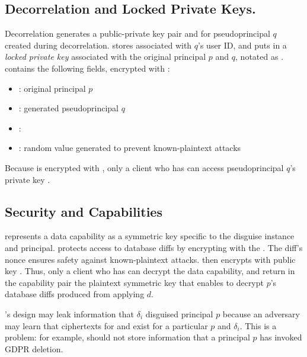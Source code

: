 \subsection{Decorrelation and Locked Private Keys.}
Decorrelation generates a public-private key pair  and  for pseudoprincipal $q$
created during decorrelation.
\sys stores  associated with $q$'s user ID, and puts  in a \emph{locked private key}
associated with the original principal $p$ and $q$, notated as .  contains the
following fields, encrypted with :
\begin{itemize}
\item {}: original principal $p$
\item {}: generated pseudoprincipal $q$
\item {}: 
\item {}: random value generated to prevent known-plaintext attacks
\end{itemize}
\noindent Because  is encrypted with , only a client who has
 can access pseudoprincipal $q$'s private key .

\subsection{Security and Capabilities}
\sys represents a data capability  as a symmetric key specific to
the disguise instance and principal.
%
\sys protects access to database diffs  by encrypting  with the
. The diff's nonce ensures safety against known-plaintext attacks. \sys then encrypts
 with public key .  
%
Thus, only a client who has  can decrypt the data capability, and return in the capability pair the plaintext symmetric key that enables \sys to decrypt $p$'s database diffs produced from applying $d$.


\sys's design may leak information that $\delta_i$ disguised principal $p$ 
because an adversary may learn that ciphertexts for  and
 exist for a particular $p$ and $\delta_i$.
This is a problem: for example, \sys should not store information that a principal $p$ has
invoked GDPR deletion.

